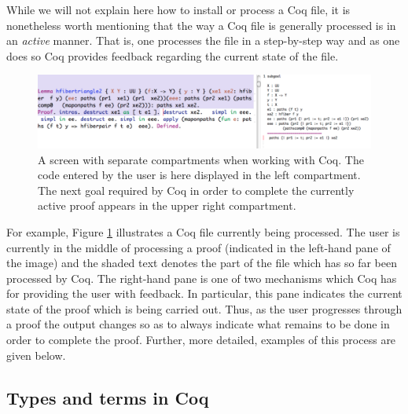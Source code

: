 While we will not explain here how to install or process a Coq file,
it is nonetheless worth mentioning that the way a Coq file is
generally processed is in an \emph{active} manner.  That is, one
processes the file in a step-by-step way and as one does so Coq
provides feedback regarding the current state of the file.
\begin{figure}[ht]
\includegraphics[width=4.9in]{screen}
  \caption{A screen with separate compartments when working with
    Coq. The code entered by the user is here displayed in the left
    compartment. The next goal required by Coq in order to complete
    the currently active proof appears in the upper right compartment.}
  \label{fig:diffeo}
\end{figure}
For example, Figure \ref{fig:diffeo} illustrates a Coq file currently
being processed.  The user is currently in the middle of processing a
proof (indicated in the left-hand pane of the image) and the shaded
text denotes the part of the file which has so far been processed by
Coq.  The right-hand pane is one of two mechanisms which Coq has for
providing the user with feedback.  In particular, this pane indicates
the current state of the proof which is being carried out.  Thus, as
the user progresses through a proof the output changes so as to always
indicate what remains to be done in order to complete the proof.
Further, more detailed, examples of this process are given below.

\subsection{Types and terms in Coq}\label{sec:sentences}

